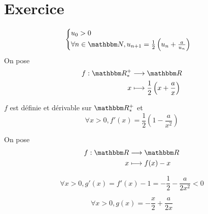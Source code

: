 \part{Exercice}

\[
	\begin{cases}
		u_0 > 0\\
		\forall n\in \N, u_{n+1} = \frac{1}{2}\left( u_n + \frac{a}{u_n} \right)
	\end{cases}
\]
On pose \begin{align*}
	f: \R_*^+ &\longrightarrow \R \\
	x &\longmapsto \frac{1}{2} \left( x + \frac{a}{x} \right) 
\end{align*}

$f$ est définie et dérivable sur $\R^+_*$ et \[
	\forall x > 0, f'(x) = \frac{1}{2}\left( 1- \frac{a}{x^2} \right)
\] 

\begin{center}
\end{center}

On pose \begin{align*}
	f: \R &\longrightarrow \R \\
	x &\longmapsto f(x) - x
\end{align*}

\[
	\forall x > 0, g'(x) = f'(x) - 1 = -\frac{1}{2} - \frac{a}{2x^2} < 0
\] 

\begin{center}
\end{center}
\[
	\forall x > 0, g(x) = -\frac{x}{2} + \frac{a}{2x}
\]

